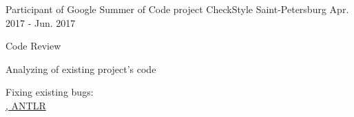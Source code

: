 

\begin{cventries}

  \cventry
    {Participant of Google Summer of Code project} %
    {CheckStyle} %
    {Saint-Petersburg} %
    {Apr. 2017 - Jun. 2017} %
    {
      \begin{cvitems} %
        \item{Code Review}
        \item{Analyzing of existing project's code}
        \item{Fixing existing bugs:
          \\ \href{https://github.com/checkstyle/checkstyle/issues?q=author\%3Aunrealwork}{\faGithubSquare\acvHeaderIconSep\@Java, ANTLR}
        }
      \end{cvitems}
    }
\end{cventries}
